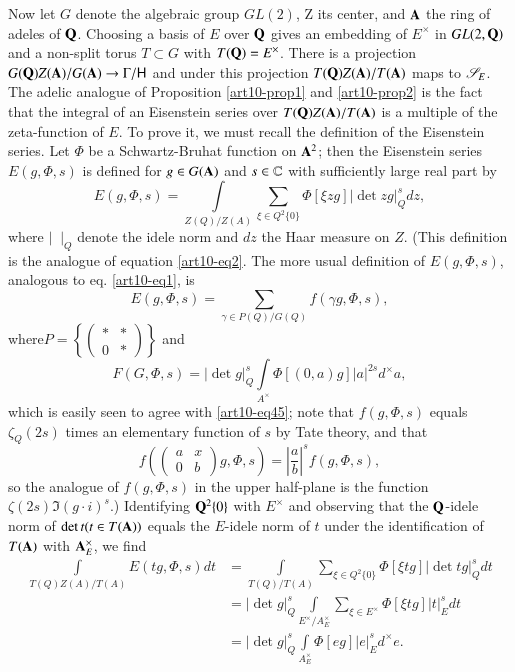 Now let $G$ denote the algebraic group $GL(2)$, Z its center, and $\mathbf{A}$ the ring of adeles of $\mathbf{Q}$. Choosing a basis of $E$ over $\mathbf{Q}$ gives an embedding of $E^\times$ in $GL (2, \mathbf{Q})$ and a non-split torus $T \subset G$ with $T (\mathbf{Q}) = E^{\times}$. There is a projection $G (\mathbf{Q}) Z(\mathbf{A})/ G (\mathbf{A}) \to \Gamma / \mathsf{H}$ and under this projection $T (\mathbf{Q}) Z (\mathbf{A}) / T (\mathbf{A})$ maps to $\mathscr{S}_E$. The adelic analogue of Proposition \ref{art10-prop1} and \ref{art10-prop2} is the fact that the integral of an Eisenstein series over $T (\mathbf{Q})Z (\mathbf{A}) / T (\mathbf{A})$ is a multiple of the zeta-function of $E$. To prove it, we must recall the definition of the Eisenstein series. Let $\Phi$ be a Schwartz-Bruhat function on $\mathbf{A}^2$; then the Eisenstein series $E (g, \Phi, s)$ is defined for $g \in G(\mathbf{A})$ and $s \in \mathbb{C}$ with sufficiently large real part by 
\begin{equation*}
E (g , \Phi, s) = \int\limits_{Z (Q) / Z (A)} \sum\limits_{\xi \in Q^2 \{0\}} \Phi [\xi z g] |\det z g|^s_Q dz, \tag{45} \label{art10-eq45}
\end{equation*}
where $|{\;\;}|_Q$ denote the idele norm and $dz$ the Haar measure on $Z$. (This definition is the analogue of equation \eqref{art10-eq2}. The more usual definition of $E(g, \Phi, s)$, analogous to eq. \eqref{art10-eq1}, is
$$
E (g, \Phi , s) = \sum\limits_{ \gamma \in P (Q) / G (Q)} f (\gamma g, \Phi , s),
$$
where\pageoriginale $P = \left\{\left(\begin{matrix}\ast & \ast \\ 0 & \ast \end{matrix}\right)\right\}$ and 
$$
F (G, \Phi, s) = |\det g|^s_Q \int\limits_{A^\times } \Phi [(0, a)g]|a|^{2s} d^\times a,
$$
which is easily seen to agree with \eqref{art10-eq45}; note that $f(g, \Phi, s)$ equals $\zeta_Q (2s)$ times an elementary function of $s$ by Tate theory, and that 
$$
f\left(\left(\begin{matrix} 
a & x \\ 0 & b
\end{matrix}
\right) g, \Phi, s\right) =  \left|\dfrac{a}{b} \right|^s f(g, \Phi, s),
$$ 
so the analogue of $f (g, \Phi, s)$ in the upper half-plane is the function $\zeta(2s) \Im (g \cdot i)^s$.)  Identifying $\mathbf{Q}^2 \{0\}$ with $E^\times$ and observing that the $\mathbf{Q}$-idele norm of $\det t (t \in T (\mathbf{A}))$ equals the $E$-idele norm of $t$ under the identification of $T (\mathbf{A})$ with $\mathbf{A}_E^\times$, we find 
\begin{align*}
\int\limits_{T(Q) Z(A)/ T (A)}  E(tg , \Phi, s) dt & =  \int\limits_{T (Q)/ T (A)} \sum\limits_{\xi \in Q^2 \{0\}} \Phi [\xi t g ] |\det tg|^s_Q dt\\
& = |\det g|^s_Q \int\limits_{E^\times / A^\times_E} \sum\limits_{\xi \in E^\times} \Phi [\xi t g] |t|^s_E dt \\
& = |\det g|^s_Q \int\limits_{A^\times_E} \Phi [eg] |e|^s_E d^\times e. 
 \end{align*}
